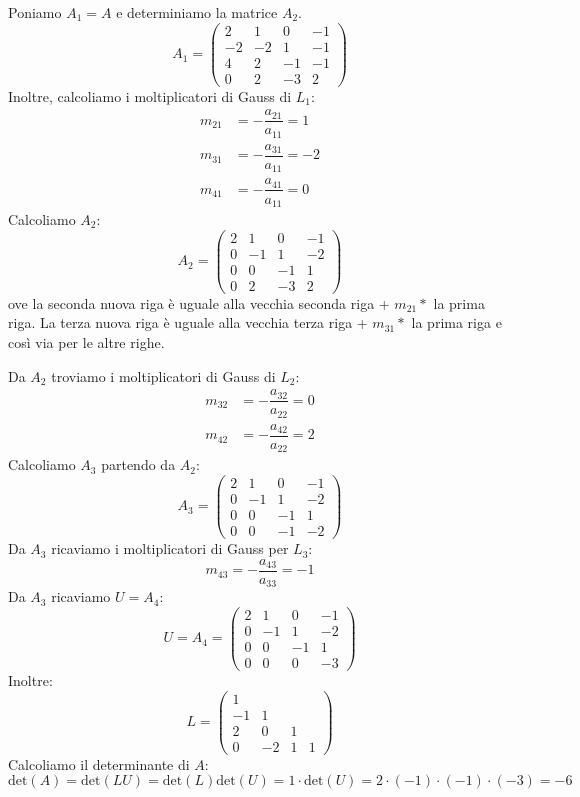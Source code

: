 \documentclass[12pt]{report}
\newcounter{exercise}
\begin{document}
\begin{exercise}{}{}
Poniamo $A_1 = A$ e determiniamo la matrice $A_2$.
\[
A_1 = \begin{pmatrix}
	2 & 1 & 0 & -1 \\
	-2 & -2 & 1 & -1 \\
	4 & 2 & -1 & -1 \\
	0 & 2 & -3 & 2
\end{pmatrix}
\]
Inoltre, calcoliamo i moltiplicatori di Gauss di $L_1$:
\begin{align*}
	m_{21} &= -\dfrac{a_{21}}{a_{11}} = 1 \\
	m_{31} &= -\dfrac{a_{31}}{a_{11}} = -2 \\
	m_{41} &= -\dfrac{a_{41}}{a_{11}} = 0
\end{align*}
Calcoliamo $A_2$:
\[
A_2 = \begin{pmatrix}
	2 & 1 & 0 & -1 \\
	0 & -1 & 1 & -2 \\
	0 & 0 & -1 & 1 \\
	0 & 2 & -3 & 2
\end{pmatrix}
\]
ove la seconda nuova riga è uguale alla vecchia seconda riga + $m_{21} *$ la prima riga. La terza nuova riga è uguale alla vecchia terza riga + $m_{31} *$ la prima riga e così via per le altre righe.

Da $A_2$ troviamo i moltiplicatori di Gauss di $L_2$:
\begin{align*}
	m_{32} &= -\dfrac{a_{32}}{a_{22}} = 0 \\
	m_{42} &= -\dfrac{a_{42}}{a_{22}} = 2
\end{align*}
Calcoliamo $A_3$ partendo da $A_2$:
\[
A_3 = \begin{pmatrix}
	2 & 1 & 0 & -1 \\
	0 & -1 & 1 & -2 \\
	0 & 0 & -1 & 1 \\
	0 & 0 & -1 & -2
\end{pmatrix}
\]
Da $A_3$ ricaviamo i moltiplicatori di Gauss per $L_3$:
\[
m_{43} = -\dfrac{a_{43}}{a_{33}} = -1
\]
Da $A_3$ ricaviamo $U = A_4$:
\[
U = A_4 = \begin{pmatrix}
	2 & 1 & 0 & -1 \\
	0 & -1 & 1 & -2 \\
	0 & 0 & -1 & 1 \\
	0 & 0 & 0 & -3
\end{pmatrix}
\]
Inoltre:
\[
L = \begin{pmatrix}
	1 \\
	-1 & 1\\
	2 & 0 & 1\\
	0 & -2 & 1 & 1
\end{pmatrix}
\]
Calcoliamo il determinante di $A$:
\[
\text{det}(A) = \text{det}(LU) = \text{det}(L)\text{det}(U) = 1 \cdot \text{det}(U) = 2 \cdot (-1) \cdot (-1) \cdot (-3) = -6
\]
\end{exercise}
\end{document}

